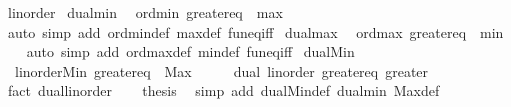 \begin{isabellebody}
\endisatagproof
{\isafoldproof}%
%
\isadelimproof
\isanewline
%
\endisadelimproof
\isanewline
{}\isamarkupfalse%
\ linorder\isanewline
{}\isanewline
\isanewline
{}\isamarkupfalse%
\ dual{\isacharunderscore}{\kern0pt}min{\isacharcolon}{\kern0pt}\isanewline
\ \ {\isachardoublequoteopen}ord{\isachardot}{\kern0pt}min\ greater{\isacharunderscore}{\kern0pt}eq\ {\isacharequal}{\kern0pt}\ max{\isachardoublequoteclose}\isanewline
%
\isadelimproof
\ \ %
\endisadelimproof
%
\isatagproof
{}\isamarkupfalse%
\ {\isacharparenleft}{\kern0pt}auto\ simp\ add{\isacharcolon}{\kern0pt}\ ord{\isachardot}{\kern0pt}min{\isacharunderscore}{\kern0pt}def\ max{\isacharunderscore}{\kern0pt}def\ fun{\isacharunderscore}{\kern0pt}eq{\isacharunderscore}{\kern0pt}iff{\isacharparenright}{\kern0pt}%
\endisatagproof
{\isafoldproof}%
%
\isadelimproof
\isanewline
%
\endisadelimproof
\isanewline
{}\isamarkupfalse%
\ dual{\isacharunderscore}{\kern0pt}max{\isacharcolon}{\kern0pt}\isanewline
\ \ {\isachardoublequoteopen}ord{\isachardot}{\kern0pt}max\ greater{\isacharunderscore}{\kern0pt}eq\ {\isacharequal}{\kern0pt}\ min{\isachardoublequoteclose}\isanewline
%
\isadelimproof
\ \ %
\endisadelimproof
%
\isatagproof
{}\isamarkupfalse%
\ {\isacharparenleft}{\kern0pt}auto\ simp\ add{\isacharcolon}{\kern0pt}\ ord{\isachardot}{\kern0pt}max{\isacharunderscore}{\kern0pt}def\ min{\isacharunderscore}{\kern0pt}def\ fun{\isacharunderscore}{\kern0pt}eq{\isacharunderscore}{\kern0pt}iff{\isacharparenright}{\kern0pt}%
\endisatagproof
{\isafoldproof}%
%
\isadelimproof
\isanewline
%
\endisadelimproof
\isanewline
{}\isamarkupfalse%
\ dual{\isacharunderscore}{\kern0pt}Min{\isacharcolon}{\kern0pt}\isanewline
\ \ {\isachardoublequoteopen}linorder{\isachardot}{\kern0pt}Min\ greater{\isacharunderscore}{\kern0pt}eq\ {\isacharequal}{\kern0pt}\ Max{\isachardoublequoteclose}\isanewline
%
\isadelimproof
%
\endisadelimproof
%
\isatagproof
{}\isamarkupfalse%
\ {\isacharminus}{\kern0pt}\isanewline
\ \ \isamarkupfalse%
\ dual{\isacharcolon}{\kern0pt}\ linorder\ greater{\isacharunderscore}{\kern0pt}eq\ greater\ \isamarkupfalse%
\ {\isacharparenleft}{\kern0pt}fact\ dual{\isacharunderscore}{\kern0pt}linorder{\isacharparenright}{\kern0pt}\isanewline
\ \ \isamarkupfalse%
\ {\isacharquery}{\kern0pt}thesis\ \isamarkupfalse%
\ {\isacharparenleft}{\kern0pt}simp\ add{\isacharcolon}{\kern0pt}\ dual{\isachardot}{\kern0pt}Min{\isacharunderscore}{\kern0pt}def\ dual{\isacharunderscore}{\kern0pt}min\ Max{\isacharunderscore}{\kern0pt}def{\isacharparenright}{\kern0pt}\isanewline

\end{isabellebody}
